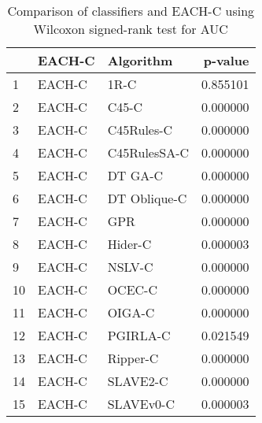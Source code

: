 \begin{table}
\footnotesize
\caption{Comparison of classifiers and EACH-C using Wilcoxon signed-rank test for AUC}
\label{tab:EACH-C wilcoxon AUC comparison}
\begin{tabular}{lllr}
\hline
 & EACH-C & Algorithm & p-value \\
\hline
1 & EACH-C & 1R-C & 0.855101 \\
2 & EACH-C & C45-C & 0.000000 \\
3 & EACH-C & C45Rules-C & 0.000000 \\
4 & EACH-C & C45RulesSA-C & 0.000000 \\
5 & EACH-C & DT GA-C & 0.000000 \\
6 & EACH-C & DT Oblique-C & 0.000000 \\
7 & EACH-C & GPR & 0.000000 \\
8 & EACH-C & Hider-C & 0.000003 \\
9 & EACH-C & NSLV-C & 0.000000 \\
10 & EACH-C & OCEC-C & 0.000000 \\
11 & EACH-C & OIGA-C & 0.000000 \\
12 & EACH-C & PGIRLA-C & 0.021549 \\
13 & EACH-C & Ripper-C & 0.000000 \\
14 & EACH-C & SLAVE2-C & 0.000000 \\
15 & EACH-C & SLAVEv0-C & 0.000003 \\
\hline
\end{tabular}
\end{table}
